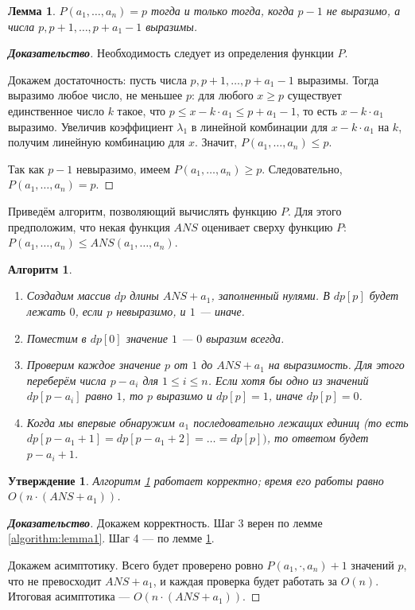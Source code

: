 \documentclass[12pt]{article}
\newtheorem{proposition}[theorem]{Утверждение}
\newtheorem{lemma}[theorem]{Лемма}
\newtheorem{algorithm}[theorem]{Алгоритм}
\begin{document}
\begin{lemma}
\label{algorithm:lemma2}
$P(a_1, \dots, a_n) = p$ тогда и только тогда, когда $p - 1$ не выразимо, а числа $p, p + 1, \dots, p + a_1 - 1$ выразимы.
\end{lemma}
\begin{proof}[\textbf{Доказательство}]
Необходимость следует из определения функции $P$.

Докажем достаточность: пусть числа $p, p + 1, \dots, p + a_1 - 1$ выразимы. Тогда выразимо любое число, не меньшее $p$: для любого $x \ge p$ существует единственное число $k$ такое, что $p \le x - k \cdot a_1 \le p + a_1 - 1$, то есть $x - k \cdot a_1$ выразимо. Увеличив коэффициент $\lambda_1$ в линейной комбинации для $x - k \cdot a_1$ на $k$, получим линейную комбинацию для $x$. Значит, $P(a_1, \dots, a_n) \le p$.

Так как $p - 1$ невыразимо, имеем $P(a_1, \dots, a_n) \ge p$. Следовательно, $P(a_1, \dots, a_n) = p$.
\end{proof}

Приведём алгоритм, позволяющий вычислять функцию $P$. Для этого предположим, что некая функция $ANS$ оценивает сверху функцию $P$: $P(a_1, \dots, a_n) \le ANS(a_1, \dots, a_n)$.

\begin{algorithm}
\label{algorithm}
\begin{enumerate}
    \item Создадим массив $dp$ длины $ANS + a_1$, заполненный нулями. В $dp[p]$ будет лежать $0$, если $p$ невыразимо, и $1$ --- иначе.
    \item Поместим в $dp[0]$ значение $1$ --- $0$ выразим всегда.
    \item Проверим каждое значение $p$ от $1$ до $ANS + a_1$ на выразимость. Для этого переберём числа $p - a_i$ для $1 \le i \le n$. Если хотя бы одно из значений $dp[p - a_i]$ равно $1$, то $p$ выразимо и $dp[p] = 1$, иначе $dp[p] = 0$.
    \item Когда мы впервые обнаружим $a_1$ последовательно лежащих единиц (то есть\\  $dp[p - a_1 + 1] = dp[p - a_1 + 2] = \dots = dp[p])$, то ответом будет $p - a_i + 1$. 
\end{enumerate}
\end{algorithm}

\begin{proposition}
Алгоритм \ref{algorithm} работает корректно; время его работы равно $O(n \cdot (ANS + a_1))$.
\end{proposition}
\begin{proof}[\textbf{Доказательство}]
Докажем корректность. Шаг 3 верен по лемме \ref{algorithm:lemma1}. Шаг 4 --- по лемме \ref{algorithm:lemma2}.

Докажем асимптотику. Всего будет проверено ровно $P(a_1, \cdot, a_n) + 1$ значений $p$, что не превосходит $ANS + a_1$, и каждая проверка будет работать за $O(n)$. Итоговая асимптотика --- $O(n \cdot (ANS + a_1))$.
\end{proof}
\end{document}
